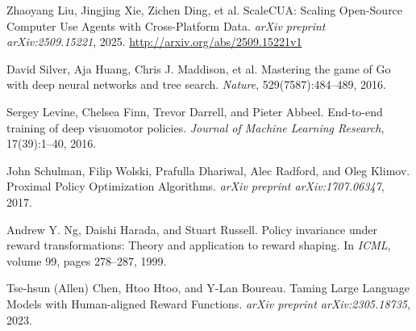 \documentclass{article}
\begin{document}

\begin{thebibliography}{9}

Zhaoyang Liu, Jingjing Xie, Zichen Ding, et al.
\newblock ScaleCUA: Scaling Open-Source Computer Use Agents with Cross-Platform Data.
\newblock \emph{arXiv preprint arXiv:2509.15221}, 2025.
\newblock \href{http://arxiv.org/abs/2509.15221v1}{http://arxiv.org/abs/2509.15221v1}

David Silver, Aja Huang, Chris J. Maddison, et al.
\newblock Mastering the game of Go with deep neural networks and tree search.
\newblock \emph{Nature}, 529(7587):484--489, 2016.

Sergey Levine, Chelsea Finn, Trevor Darrell, and Pieter Abbeel.
\newblock End-to-end training of deep visuomotor policies.
\newblock \emph{Journal of Machine Learning Research}, 17(39):1--40, 2016.

John Schulman, Filip Wolski, Prafulla Dhariwal, Alec Radford, and Oleg Klimov.
\newblock Proximal Policy Optimization Algorithms.
\newblock \emph{arXiv preprint arXiv:1707.06347}, 2017.

Andrew Y. Ng, Daishi Harada, and Stuart Russell.
\newblock Policy invariance under reward transformations: Theory and application to reward shaping.
\newblock In \emph{ICML}, volume 99, pages 278--287, 1999.

Tse-hsun (Allen) Chen, Htoo Htoo, and Y-Lan Boureau.
\newblock Taming Large Language Models with Human-aligned Reward Functions.
\newblock \emph{arXiv preprint arXiv:2305.18735}, 2023.

\end{thebibliography}
\end{document}
